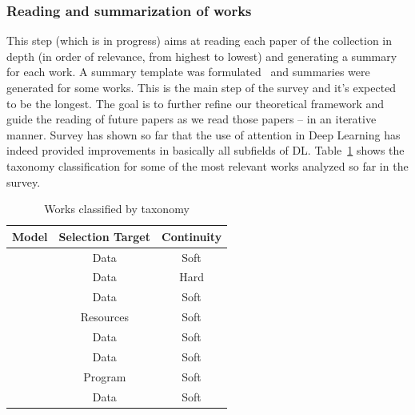 \documentclass[12pt]{article}
\begin{document}
\subsubsection{Reading and summarization of works}
This step (which is in progress) aims at reading each paper of the collection in depth
(in order of relevance, from highest to lowest) and generating a summary for each work.
A summary template was formulated~\cite{ref:paper-anal-template} and summaries were generated for some works.
This is the main step of the survey and it's expected to be the longest.
The goal is to further refine our theoretical framework and guide the reading of future papers as we read those papers
-- in an iterative manner.
Survey has shown so far that the use of attention in Deep Learning has indeed provided improvements in basically all
subfields of DL.
Table~\ref{table:taxonomy} shows the taxonomy classification for some of the most relevant works analyzed so far in the survey.

\begin{table}[H]
\centering
\caption{\small Works classified by taxonomy}
\begin{tabular}{|c|c|c|}
	\hline
    \textbf{Model} & \textbf{Selection Target} & \textbf{Continuity}\\
    \hline
    \cite{ref:show-attend-tell} & Data & Soft\\
    \hline
    \cite{ref:rec-models} & Data & Hard\\
    \hline
    \cite{ref:one-shot} & Data & Soft\\
    \hline
    \cite{ref:act} & Resources & Soft\\
    \hline
    \cite{ref:ntm} & Data & Soft\\
    \hline
    \cite{ref:img-captioning} & Data & Soft\\
    \hline
    \cite{ref:np} & Program & Soft\\
    \hline
    \cite{ref:transformer} & Data & Soft\\
    \hline
\end{tabular}
\label{table:taxonomy}
\end{table}

\newpage
\printbibliography

%
%
\end{document}
